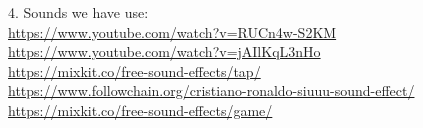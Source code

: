 \documentclass[12pt,a4paper]{report}
\begin{document}
4. Sounds we have use: \\
\indent \textcolor{blue}{\href{https://www.youtube.com/watch?v=RUCn4w-S2KM}{https://www.youtube.com/watch?v=RUCn4w-S2KM}}\\[0.2cm]
\indent \textcolor{blue}{\href{https://www.youtube.com/watch?v=jAIlKqL3nHo}{https://www.youtube.com/watch?v=jAIlKqL3nHo}}\\[0.2cm]
\indent \textcolor{blue}{\href{https://mixkit.co/free-sound-effects/tap/}{https://mixkit.co/free-sound-effects/tap/}}\\[0.2cm]
\indent \textcolor{blue}{\href{https://www.followchain.org/cristiano-ronaldo-siuuu-sound-effect/}{https://www.followchain.org/cristiano-ronaldo-siuuu-sound-effect/}}\\[0.2cm]
\indent \textcolor{blue}{\href{https://mixkit.co/free-sound-effects/game/}{https://mixkit.co/free-sound-effects/game/}}\\[0.2cm]
\end{document}
